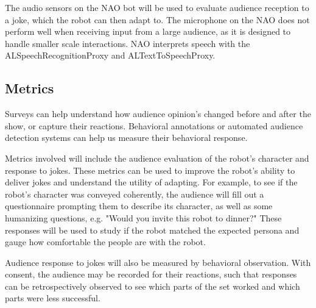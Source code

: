 \documentclass[onecolumn, draftclsnofoot,10pt, compsoc]{IEEEtran}
\begin{document}
The audio sensors on the NAO bot will be used to evaluate audience reception to a joke, which the robot can then adapt to. The microphone on the NAO does not perform well when receiving input from a large audience, as it is designed to handle smaller scale interactions. NAO interprets speech with the ALSpeechRecognitionProxy and ALTextToSpeechProxy.


\subsection{Metrics}

Surveys can help understand how audience opinion's changed before and after the show, or capture their reactions. Behavioral annotations or automated audience detection systems can help us measure their behavioral response.

Metrics involved will include the audience evaluation of the robot’s character and response to jokes. These metrics can be used to improve the robot's ability to deliver jokes and understand the utility of adapting. For example, to see if the robot’s character was conveyed coherently, the audience will fill out a questionnaire prompting them to describe its character, as well as some humanizing questions, e.g. "Would you invite this robot to dinner?" These responses will be used to study if the robot matched the expected persona and gauge how comfortable the people are with the robot.

Audience response to jokes will also be measured by behavioral observation. With consent, the audience may be recorded for their reactions, such that responses can be retrospectively observed to see which parts of the set worked and which parts were less successful.
\end{document}
